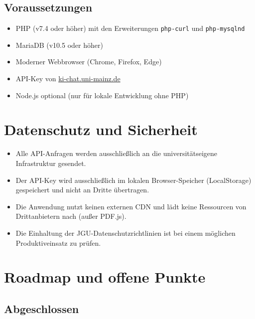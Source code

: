 \documentclass[12pt, a4paper]{article}
\begin{document}
\subsection{Voraussetzungen}

\begin{itemize}[leftmargin=1.5cm]
  \item PHP (v7.4 oder höher) mit den Erweiterungen \texttt{php-curl} und \texttt{php-mysqlnd}
  \item MariaDB (v10.5 oder höher)
  \item Moderner Webbrowser (Chrome, Firefox, Edge)
  \item API-Key von \href{https://ki-chat.uni-mainz.de}{ki-chat.uni-mainz.de}
  \item Node.js optional (nur für lokale Entwicklung ohne PHP)
\end{itemize}

\section{Datenschutz und Sicherheit}

\begin{itemize}[leftmargin=1.5cm]
  \item Alle API-Anfragen werden ausschließlich an die universitätseigene Infrastruktur gesendet.
  \item Der API-Key wird ausschließlich im lokalen Browser-Speicher (LocalStorage) gespeichert und nicht an Dritte übertragen.
  \item Die Anwendung nutzt keinen externen CDN und lädt keine Ressourcen von Drittanbietern nach (außer PDF.js).
  \item Die Einhaltung der JGU-Datenschutzrichtlinien ist bei einem möglichen Produktiveinsatz zu prüfen.
\end{itemize}

\section{Roadmap und offene Punkte}

\subsection{Abgeschlossen}
\end{document}
